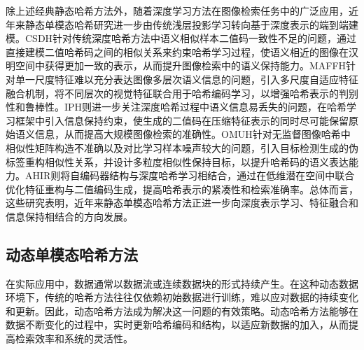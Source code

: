 除上述经典静态哈希方法外，随着深度学习方法在图像检索任务中的广泛应用，近年来静态单模态哈希研究进一步由传统浅层投影学习转向基于深度表示的端到端建模。CSDH针对传统深度哈希方法中语义相似样本二值码一致性不足的问题，通过直接建模二值哈希码之间的相似关系来约束哈希学习过程，使语义相近的图像在汉明空间中获得更加一致的表示，从而提升图像检索中的语义保持能力。MAFFH针对单一尺度特征难以充分表达图像多层次语义信息的问题，引入多尺度自适应特征融合机制，将不同层次的视觉特征联合用于哈希编码学习，以增强哈希表示的判别性和鲁棒性。IPH则进一步关注深度哈希过程中语义信息易丢失的问题，在哈希学习框架中引入信息保持约束，使生成的二值码在压缩特征表示的同时尽可能保留原始语义信息，从而提高大规模图像检索的准确性。OMUH针对无监督图像哈希中相似性矩阵构造不准确以及对比学习样本噪声较大的问题，引入目标检测生成的伪标签重构相似性关系，并设计多粒度相似性保持目标，以提升哈希码的语义表达能力。AHIR则将自编码器结构与深度哈希学习相结合，通过在低维潜在空间中联合优化特征重构与二值编码生成，提高哈希表示的紧凑性和检索准确率。总体而言，这些研究表明，近年来静态单模态哈希方法正进一步向深度表示学习、特征融合和信息保持相结合的方向发展。

\subsection{动态单模态哈希方法}
在实际应用中，数据通常以数据流或连续数据块的形式持续产生。在这种动态数据环境下，传统的哈希方法往往仅依赖初始数据进行训练，难以应对数据的持续变化和更新。因此，动态哈希方法成为解决这一问题的有效策略。动态哈希方法能够在数据不断变化的过程中，实时更新哈希编码和结构，以适应新数据的加入，从而提高检索效率和系统的灵活性。

